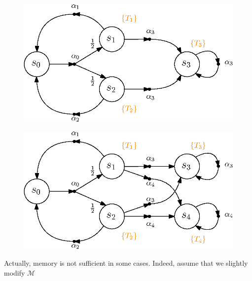 \begin{figure}[h]
  \vspace{-.05\linewidth}
  \begin{minipage}{0.49\linewidth}
    \centering
    \includegraphics[width=0.9\linewidth]{resources/MDP-memory}
    \captionsetup{justification=centering}
    \label{MDP-memory-1}
  \end{minipage}
  \begin{minipage}{0.5\linewidth}
    \centering
    \vspace{.12\linewidth}
    \includegraphics[width=0.9\linewidth]{resources/MDP-memory-2}
    \captionsetup{justification=centering}
    \label{MDP-memory-2}
  \end{minipage}
\end{figure}
Actually, memory is not sufficient in some cases.
Indeed, assume that we slightly modify $\mathcal{M}$
